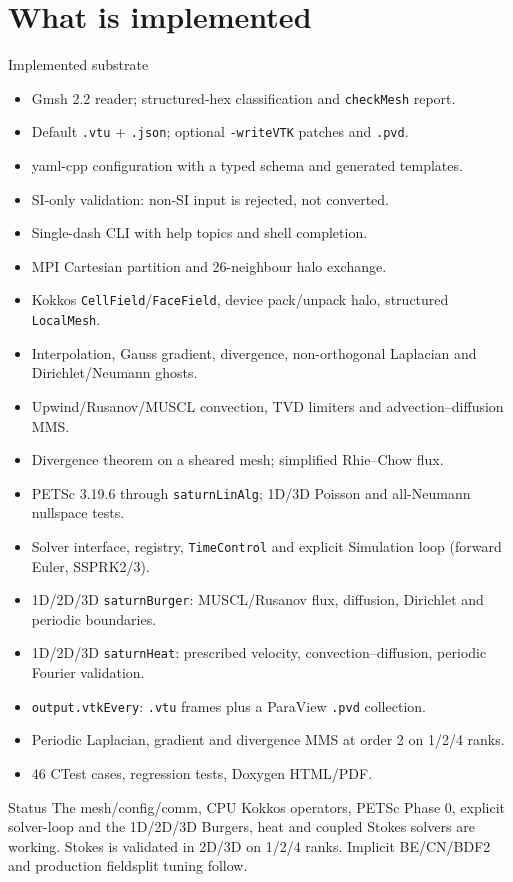\documentclass[aspectratio=169,10pt]{beamer}
\begin{document}
\section{What is implemented}

\begin{frame}{Implemented substrate}
  \begin{itemize}
    \item Gmsh 2.2 reader; structured-hex classification and
          \texttt{checkMesh} report.
    \item Default \texttt{.vtu} + \texttt{.json}; optional
          \texttt{-writeVTK} patches and \texttt{.pvd}.
    \item yaml-cpp configuration with a typed schema and generated templates.
    \item SI-only validation: non-SI input is rejected, not converted.
    \item Single-dash CLI with help topics and shell completion.
    \item MPI Cartesian partition and 26-neighbour halo exchange.
    \item Kokkos \texttt{CellField}/\texttt{FaceField}, device pack/unpack halo,
          structured \texttt{LocalMesh}.
    \item Interpolation, Gauss gradient, divergence, non-orthogonal Laplacian
          and Dirichlet/Neumann ghosts.
    \item Upwind/Rusanov/MUSCL convection, TVD limiters and advection--diffusion
          MMS.
    \item Divergence theorem on a sheared mesh; simplified Rhie--Chow flux.
    \item PETSc 3.19.6 through \texttt{saturnLinAlg}; 1D/3D Poisson and
          all-Neumann nullspace tests.
    \item Solver interface, registry, \texttt{TimeControl} and explicit
          Simulation loop (forward Euler, SSPRK2/3).
    \item 1D/2D/3D \texttt{saturnBurger}: MUSCL/Rusanov flux, diffusion,
          Dirichlet and periodic boundaries.
    \item 1D/2D/3D \texttt{saturnHeat}: prescribed velocity,
          convection--diffusion, periodic Fourier validation.
    \item \texttt{output.vtkEvery}: \texttt{.vtu} frames plus a ParaView
          \texttt{.pvd} collection.
    \item Periodic Laplacian, gradient and divergence MMS at order 2 on
          1/2/4 ranks.
    \item 46 CTest cases, regression tests, Doxygen HTML/PDF.
  \end{itemize}

  \begin{block}{Status}
    The mesh/config/comm, CPU Kokkos operators, PETSc Phase 0, explicit
    solver-loop and the 1D/2D/3D Burgers, heat and coupled Stokes solvers are
    working. Stokes is validated in 2D/3D on 1/2/4 ranks. Implicit
    BE/CN/BDF2 and production fieldsplit tuning follow.
  \end{block}
\end{frame}
\end{document}
